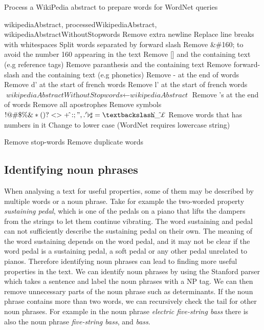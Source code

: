 \begin{algorithm}
	\caption{Process a WikiPedia abstract to prepare words for WordNet queries}\label{euclid}
	\begin{algorithmic}[1]
		\Require wikipediaAbstract,
		\Ensure processedWikipediaAbstract, wikipediaAbstractWithoutStopwords
		\State Remove extra newline
		\State Replace line breaks with whitespaces
		\State Split words separated by forward slash
		\State Remove \&\#160; to avoid the number 160 appearing in the text
		\State Remove [] and the containing text (e.g reference tags)
		\State Remove paranthesis and the containing text
		\State Remove forward-slash and the containing text (e.g phonetics)
		\State Remove - at the end of words
		\State Remove d' at the start of french words
		\State Remove l' at the start of french words
		\EndFor
		\State $\textit{wikipediaAbstractWithoutStopwords} \gets \textit{wikipediaAbstract}$
		\State Remove 's at the end of words
		\State Remove all apostrophes
		\State Remove symbols $!@\#\$\%\&*(){}?<>+\hat{}:;",.'\flat\sharp=\textbackslash\grave{}\_\tilde{}\pounds$\texteuro\textcurrency
		\State Remove words that has numbers in it
		\State Change to lower case (WordNet requires lowercase string)
		
		\State Remove stop-words
		\State Remove duplicate words
		\EndFor
		
		\State {}
		\EndProcedure
	\end{algorithmic}
\end{algorithm}


\subsection{Identifying noun phrases}
When analysing a text for useful properties, some of them may be described by multiple words or a noun phrase. Take for example the two-worded property \emph{sustaining pedal}, which is one of the pedals on a piano that lifts the dampers from the strings to let them continue vibrating. The word sustaining and pedal can not sufficiently describe the sustaining pedal on their own. The meaning of the word sustaining depends on the word pedal, and it may not be clear if the word pedal is a sustaining pedal, a soft pedal or any other pedal unrelated to pianos. Therefore identifying noun phrases can lead to finding more useful properties in the text. We can identify noun phrases by using the Stanford parser which takes a sentence and label the noun phrases with a NP tag. We can then remove unnecessary parts of the noun phrase such as determinants. If the noun phrase contains more than two words, we can recursively check the tail for other noun phrases. For example in the noun phrase \emph{electric five-string bass} there is also the noun phrase \emph{five-string bass}, and \emph{bass}.

